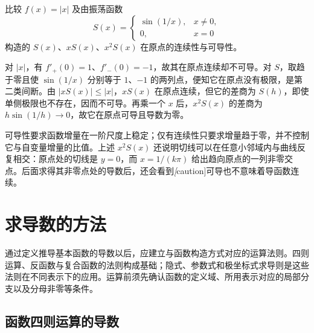 \begin{example}
\label{ex:absolute-value-and-oscillatory-differentiability}
比较 $f(x)=|x|$ 及由振荡函数
\[
    S(x)=\begin{cases}\sin(1/x),&x\ne0,\\0,&x=0\end{cases}
\]
构造的 $S(x)$、$xS(x)$、$x^2S(x)$ 在原点的连续性与可导性。
\end{example}
\begin{solve}
对 $|x|$，有 $f'_+(0)=1$、$f'_-(0)=-1$，故其在原点连续却不可导。对 $S$，取趋于零且使 $\sin(1/x)$ 分别等于 $1$、$-1$ 的两列点，便知它在原点没有极限，是第二类间断。由 $|xS(x)|\leq|x|$，$xS(x)$ 在原点连续，但它的差商为 $S(h)$，即使单侧极限也不存在，因而不可导。再乘一个 $x$ 后，$x^2S(x)$ 的差商为 $h\sin(1/h)\to0$，故它在原点可导且导数为零。
\end{solve}

可导性要求函数增量在一阶尺度上稳定；仅有连续性只要求增量趋于零，并不控制它与自变量增量的比值。上述 $x^2S(x)$ 还说明切线可以在任意小邻域内与曲线反复相交：原点处的切线是 $y=0$，而 $x=1/(k\pi)$ 给出趋向原点的一列非零交点。后面求得其非零点处的导数后，还会看到\emph[caution]{可导也不意味着导函数连续}。

\section{求导数的方法}
\label{sec:differentiation-methods}

通过定义推导基本函数的导数以后，应建立与函数构造方式对应的运算法则。四则运算、反函数与复合函数的法则构成基础；隐式、参数式和极坐标式求导则是这些法则在不同表示下的应用。运算前须先确认函数的定义域、所用表示对应的局部分支以及分母非零等条件。

\subsection{函数四则运算的导数}
\label{subsec:arithmetic-differentiation-rules}

